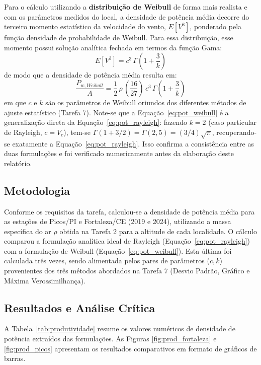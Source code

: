 \documentclass[11pt,a4paper]{article}
\begin{document}
Para o cálculo utilizando a \textbf{distribuição de Weibull} de forma mais realista e com os parâmetros medidos do local, a densidade de potência média decorre do terceiro momento estatístico da velocidade do vento, $E[V^3]$, ponderado pela função densidade de probabilidade de Weibull. Para essa distribuição, esse momento possui solução analítica fechada em termos da função Gama:
\begin{equation}
    E[V^3] = c^3\,\Gamma\!\left(1+\frac{3}{k}\right)
\end{equation}
de modo que a densidade de potência média resulta em:
\begin{equation}
    \frac{P_{w,Weibull}}{A} = \frac{1}{2}\,\rho\,\left(\frac{16}{27}\right)\,c^3\,\Gamma\!\left(1+\frac{3}{k}\right)
    \label{eq:pot_weibull}
\end{equation}
em que $c$ e $k$ são os parâmetros de Weibull oriundos dos diferentes métodos de ajuste estatístico (Tarefa 7). Note-se que a Equação~\eqref{eq:pot_weibull} é a generalização direta da Equação~\eqref{eq:pot_rayleigh}: fazendo $k=2$ (caso particular de Rayleigh, $c=V_c$), tem-se $\Gamma(1+3/2)=\Gamma(2{,}5)=(3/4)\sqrt{\pi}$, recuperando-se exatamente a Equação~\eqref{eq:pot_rayleigh}. Isso confirma a consistência entre as duas formulações e foi verificado numericamente antes da elaboração deste relatório.

\subsection{Metodologia}
Conforme os requisitos da tarefa, calculou-se a densidade de potência média para as estações de Picos/PI e Fortaleza/CE (2019 e 2024), utilizando a massa específica do ar $\rho$ obtida na Tarefa 2 para a altitude de cada localidade. O cálculo comparou a formulação analítica ideal de Rayleigh (Equação~\eqref{eq:pot_rayleigh}) com a formulação de Weibull (Equação~\eqref{eq:pot_weibull}). Esta última foi calculada três vezes, sendo alimentada pelos pares de parâmetros ($c, k$) provenientes dos três métodos abordados na Tarefa 7 (Desvio Padrão, Gráfico e Máxima Verossimilhança).

\subsection{Resultados e Análise Crítica}

A Tabela~\ref{tab:produtividade} resume os valores numéricos de densidade de potência extraídos das formulações. As Figuras \ref{fig:prod_fortaleza} e \ref{fig:prod_picos} apresentam os resultados comparativos em formato de gráficos de barras.
\end{document}
